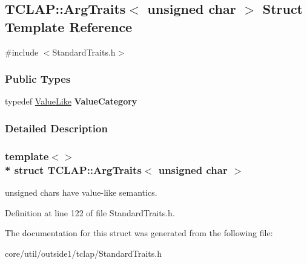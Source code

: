 \hypertarget{structTCLAP_1_1ArgTraits_3_01unsigned_01char_01_4}{}\subsection{T\+C\+L\+AP\+:\+:Arg\+Traits$<$ unsigned char $>$ Struct Template Reference}
\label{structTCLAP_1_1ArgTraits_3_01unsigned_01char_01_4}


{\ttfamily \#include $<$Standard\+Traits.\+h$>$}

\subsubsection*{Public Types}
\begin{DoxyCompactItemize}
\item 
typedef \hyperlink{structTCLAP_1_1ValueLike}{Value\+Like} {\bfseries Value\+Category}\hypertarget{structTCLAP_1_1ArgTraits_3_01unsigned_01char_01_4_a3cba1e41ab04d31c7b68b1c5e6e227aa}{}\label{structTCLAP_1_1ArgTraits_3_01unsigned_01char_01_4_a3cba1e41ab04d31c7b68b1c5e6e227aa}

\end{DoxyCompactItemize}


\subsubsection{Detailed Description}
\subsubsection*{template$<$$>$\\*
struct T\+C\+L\+A\+P\+::\+Arg\+Traits$<$ unsigned char $>$}

unsigned chars have value-\/like semantics. 

Definition at line 122 of file Standard\+Traits.\+h.



The documentation for this struct was generated from the following file\+:\begin{DoxyCompactItemize}
\item 
core/util/outside1/tclap/Standard\+Traits.\+h\end{DoxyCompactItemize}
